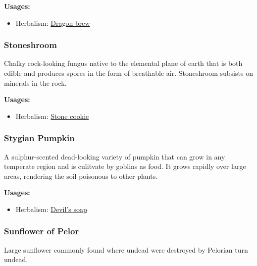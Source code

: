\vspace{5mm}

\textbf{Usages:}

\begin{itemize}[noitemsep]
\item[] Herbalism: \hyperref[Dragon brew]{Dragon brew}
\end{itemize}

\subsubsection{Stoneshroom}
\label{Stoneshroom}

Chalky rock-looking fungus native to the elemental plane of earth that is both edible and produces spores in the form of breathable air. Stoneshroom subsists on minerals in the rock.

\vspace{5mm}

\textbf{Usages:}

\begin{itemize}[noitemsep]
\item[] Herbalism: \hyperref[Stone cookie]{Stone cookie}
\end{itemize}

\subsubsection{Stygian Pumpkin}
\label{Stygian Pumpkin}

A sulphur-scented dead-looking variety of pumpkin that can grow in any temperate region and is culitvate by goblins as food. It grows rapidly over large areas, rendering the soil poisonous to other plants.

\vspace{5mm}

\textbf{Usages:}

\begin{itemize}[noitemsep]
\item[] Herbalism: \hyperref[Devil's soap]{Devil's soap}
\end{itemize}

\subsubsection{Sunflower of Pelor}
\label{Sunflower of Pelor}

Large sunflower commonly found where undead were destroyed by Pelorian turn undead.

\vspace{5mm}

